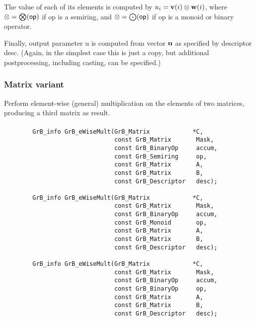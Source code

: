 The value of each of its elements is computed by 
$u_i = {\bf v}(i) \otimes {\bf w}(i)$, where
$\otimes = \bigotimes({\sf op})$ if {\sf op} is a semiring, and 
$\otimes = \bigodot({\sf op})$ if {\sf op} is a monoid or binary operator.

Finally, output parameter {\sf u} is computed from vector ${\bf u}$
as specified by descriptor {\sf desc}. (Again, in the simplest case this
is just a copy, but additional postprocessing, including casting, can be specified.)


\subsubsection{Matrix variant}

Perform element-wise (general) multiplication on the elements of two matrices,
producing a third matrix as result.

\paragraph{\syntax}

\begin{verbatim}
        GrB_info GrB_eWiseMult(GrB_Matrix            *C,
                               const GrB_Matrix       Mask,
                               const GrB_BinaryOp     accum,
                               const GrB_Semiring     op, 
                               const GrB_Matrix       A,
                               const GrB_Matrix       B,
                               const GrB_Descriptor   desc);
                            
        GrB_info GrB_eWiseMult(GrB_Matrix            *C,
                               const GrB_Matrix       Mask,
                               const GrB_BinaryOp     accum,
                               const GrB_Monoid       op, 
                               const GrB_Matrix       A,
                               const GrB_Matrix       B,
                               const GrB_Descriptor   desc);
                            
        GrB_info GrB_eWiseMult(GrB_Matrix            *C,
                               const GrB_Matrix       Mask,
                               const GrB_BinaryOp     accum,
                               const GrB_BinaryOp     op, 
                               const GrB_Matrix       A,
                               const GrB_Matrix       B,
                               const GrB_Descriptor   desc);
\end{verbatim}

